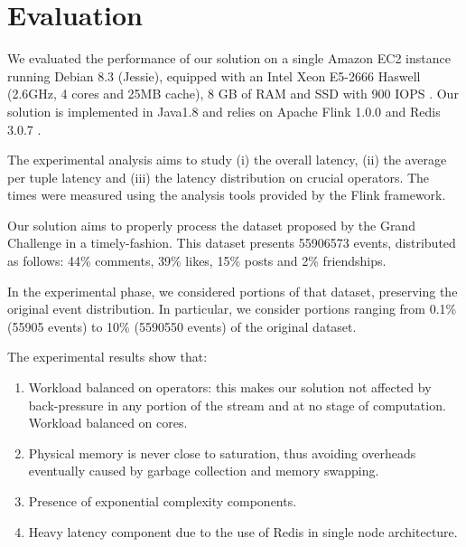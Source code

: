 \section{Evaluation}
\label{sec:evaluation}

We evaluated the performance of our solution on a single Amazon EC2 instance running Debian 8.3 (Jessie), equipped with an Intel Xeon E5-2666 Haswell (2.6GHz, 4 cores and 25MB cache), 8 GB of RAM and SSD with 900 IOPS \cite{AWSEC2InstanceTypes}. 
Our solution is implemented in Java1.8 and relies on Apache Flink 1.0.0 \cite{Flink} and Redis 3.0.7 \cite{Redis}.

The experimental analysis aims to study (i) the overall latency, (ii) the average per tuple latency and (iii) the latency distribution on crucial operators. The times were measured using the analysis tools provided by the Flink framework.

Our solution aims to properly process the dataset proposed by the Grand Challenge in a timely-fashion. This dataset presents 55906573 events, distributed as follows:  44\% comments, 39\% likes, 15\% posts and 2\% friendships.

In the experimental phase, we considered portions of that dataset, preserving the original event distribution. In particular, we consider portions ranging from 0.1\% (55905 events) to 10\% (5590550 events) of the original dataset.

The experimental results show that:

\begin{enumerate}
	\item Workload balanced on operators: this makes our solution not affected by back-pressure in any portion of the stream and at no stage of computation.
	Workload balanced on cores.
	
	\item Physical memory is never close to saturation, thus avoiding overheads eventually caused by garbage collection and memory swapping.
	
	\item Presence of exponential complexity components.
	
	\item Heavy latency component due to the use of Redis in single node architecture.
\end{enumerate}